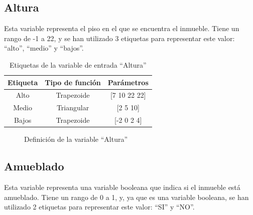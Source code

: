 \documentclass[12pt]{report} %
\begin{document}
        \subsection{Altura}
        Esta variable representa el piso en el que se encuentra el inmueble.
        Tiene un rango de -1 a 22, y se han utilizado 3 etiquetas para representar este valor: ``alto'', ``medio'' y ``bajos''.

        \begin{table}[h]
            \center
            \begin{tabular}{@{}ccc@{}}
                \toprule
                \textbf{Etiqueta} & \textbf{Tipo de función} & \textbf{Parámetros} \\
                \midrule
                Alto  & Trapezoide & [7 10 22 22] \\
                Medio & Triangular & [2 5 10]     \\
                Bajos & Trapezoide & [-2 0 2 4]   \\
                \bottomrule
            \end{tabular}
            \caption{Etiquetas de la variable de entrada ``Altura''}
        \end{table}

        \begin{figure}[H]
            \centering
            \caption{Definición de la variable ``Altura''}
        \end{figure}

        \subsection{Amueblado}
        Esta variable representa una variable booleana que indica si el inmueble está amueblado.
        Tiene un rango de 0 a 1, y, ya que es una variable booleana, se han utilizado 2 etiquetas para representar este valor: ``SI'' y ``NO''.
\end{document}

